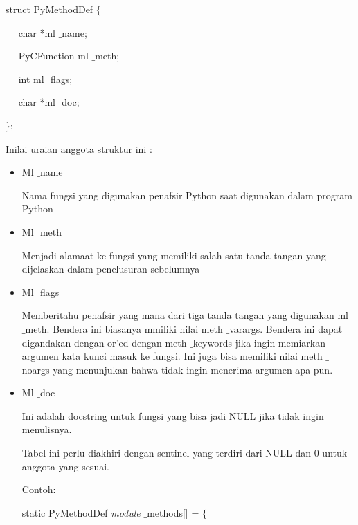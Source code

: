 \documentclass{wileySix}
\begin{document}
\begin{myEnumerate}
\begin{myEnumerate}
{\begin{myEnumerate}
struct PyMethodDef  $  \{  $ \par
\noindent 
~~ char *ml $  \_  $name; \par
\noindent 
~~ PyCFunction ml $  \_  $meth; \par
\noindent 
~~ int ml $  \_  $flags; \par
\noindent 
~~ char *ml $  \_  $doc; \par
\noindent 
$  \}  $; \par
\vspace{12pt}
\vspace{12pt}
\vspace{12pt}
\noindent 
Inilai uraian anggota struktur ini : \par
\noindent 
\begin{itemize}
	\item Ml $  \_  $name \par
	Nama fungsi yang digunakan penafsir Python saat digunakan dalam program Python \par
	\noindent 
	\item Ml $  \_  $meth \par
	Menjadi alamaat ke fungsi yang memiliki salah satu tanda tangan yang dijelaskan dalam penelusuran sebelumnya \par
	\noindent 
	\item Ml $  \_  $flags \par
	Memberitahu penafsir yang mana dari tiga tanda tangan yang digunakan ml $  \_  $meth. Bendera ini biasanya mmiliki nilai meth $  \_  $varargs. Bendera ini dapat digandakan dengan or’ed dengan meth $  \_  $keywords jika ingin memiarkan argumen kata kunci masuk ke fungsi. Ini juga bisa memiliki nilai meth $  \_  $noargs yang menunjukan bahwa tidak ingin menerima argumen apa pun. \par
	\noindent 
	\item Ml $  \_  $doc \par
	Ini adalah docstring untuk fungsi yang bisa jadi NULL jika tidak ingin menulisnya. \par
	\vspace{12pt}
	\vspace{12pt}
	\noindent 
	\hspace*{0.5in} Tabel ini perlu diakhiri dengan sentinel yang terdiri dari NULL dan 0 untuk anggota yang sesuai. \par
	\vspace{12pt}
	\noindent 
	Contoh: \par
	\noindent 
	static PyMethodDef \textit{module} $  \_  $methods[] =  $  \{  $ \par

\end{itemize}
\end{myEnumerate}}
\end{myEnumerate}
\end{myEnumerate}
\end{document}
